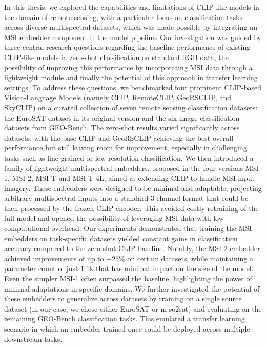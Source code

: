 \documentclass[a4paper, oneside, english]{sapthesis} %
\begin{document}
In this thesis, we explored the capabilities and limitations of CLIP-like models in the domain of remote sensing, with a particular focus on classification tasks across diverse multispectral datasets, which was made possible by integrating an MSI embedder component in the model pipeline. Our investigation was guided by three central research questions regarding the baseline performance of existing CLIP-like models in zero-shot classification on standard RGB data, the possibility of improving this performance by incorporating MSI data through a lightweight module and finally the potential of this approach in transfer learning settings.
To address these questions, we benchmarked four prominent CLIP-based Vision-Language Models (namely CLIP, RemoteCLIP, GeoRSCLIP, and SkyCLIP) on a curated collection of seven remote sensing classification datasets: the EuroSAT dataset in its original version and the six image classification datasets from GEO-Bench. The zero-shot results varied significantly across datasets, with the base CLIP and GeoRSCLIP achieving the best overall performance but still leaving room for improvement, especially in challenging tasks such as fine-grained or low-resolution classification.
We then introduced a family of lightweight multispectral embedders, proposed in the four versions MSI-1, MSI-2, MSI-T and MSI-T-4L, aimed at extending CLIP to handle MSI input imagery. These embedders were designed to be minimal and adaptable, projecting arbitrary multispectral inputs into a standard 3-channel format that could be then processed by the frozen CLIP encoder. This avoided costly retraining of the full model and opened the possibility of leveraging MSI data with low computational overhead.
Our experiments demonstrated that training the MSI embedders on task-specific datasets yielded constant gains in classification accuracy compared to the zero-shot CLIP baseline. Notably, the MSI-2 embedder achieved improvements of up to $+25\%$ on certain datasets, while maintaining a parameter count of just $1.1$k that has minimal impact on the size of the model. Even the simpler MSI-1 often surpassed the baseline, highlighting the power of minimal adaptations in specific domains.
We further investigated the potential of these embedders to generalize across datasets by training on a single source dataset (in our case, we chose either EuroSAT or m-so2sat) and evaluating on the remaining GEO-Bench classification tasks. This emulated a transfer learning scenario in which an embedder trained once could be deployed across multiple downstream tasks.
\end{document}
